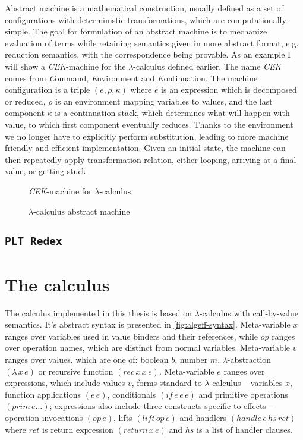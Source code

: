 \documentclass[inz, english, shortabstract]{iithesis}
\newcommand{\Redex}{\texttt{PLT Redex}}
\newcommand{\LC}{\(\lambda\)-calculus}
\begin{document}
Abstract machine is a mathematical construction, usually defined as a set of configurations with deterministic transformations, which are computationally simple.
The goal for formulation of an abstract machine is to mechanize evaluation of terms while retaining semantics given in more abstract format, e.g. reduction semantics, with the correspondence being provable\cite{Felleisen2009}.
As an example I will show a \emph{CEK}-machine for the \LC{} defined earlier.
The name \emph{CEK} comes from \emph{C}ommand, \emph{E}nvironment and \emph{K}ontinuation.
The machine configuration is a triple $ (e, \rho, \kappa) $ where $ e $ is an expression which is decomposed or reduced, $ \rho $ is an environment mapping variables to values, and the last component $ \kappa $ is a continuation stack, which determines what will happen with value, to which first component eventually reduces.
Thanks to the environment we no longer have to explicitly perform substitution, leading to more machine friendly and efficient implementation.
Given an initial state, the machine can then repeatedly apply transformation relation, either looping, arriving at a final value, or getting stuck. 
\begin{figure}
  \emph{CEK}-machine for \LC{}
  \caption{\LC{} abstract machine}
  \label{fig:lc-cek}
\end{figure}

\section{\Redex}

\chapter{The calculus}\label{ch:calculus}
The calculus implemented in this thesis is based on \LC{} with call-by-value semantics.
It's abstract syntax is presented in \autoref{fig:algeff-syntax}.
Meta-variable $ x $ ranges over variables used in value binders and their references, while $ op $ ranges over operation names, which are distinct from normal variables.
Meta-variable $ v $ ranges over values, which are one of: boolean $ b $, number $ m $, $ \lambda $-abstraction $ (\lambda \, x \, e) $ or recursive function $ (rec \, x \, x \, e) $.
Meta-variable $ e $ ranges over expressions, which include values $ v $, forms standard to \LC{} -- variables $ x $, function applications $ (e \, e) $, conditionals $ (if \, e \,e \, e) $ and primitive operations $ (prim \, e \ldots) $; expressions also include three constructs specific to effects -- operation invocations $ (op \, e) $, lifts $ (lift \, op \, e) $ and handlers $ (handle \, e \, hs \, ret) $ where $ ret $ is return expression $ (return \, x \, e) $ and $ hs $ is a list of handler clauses.
\end{document}
